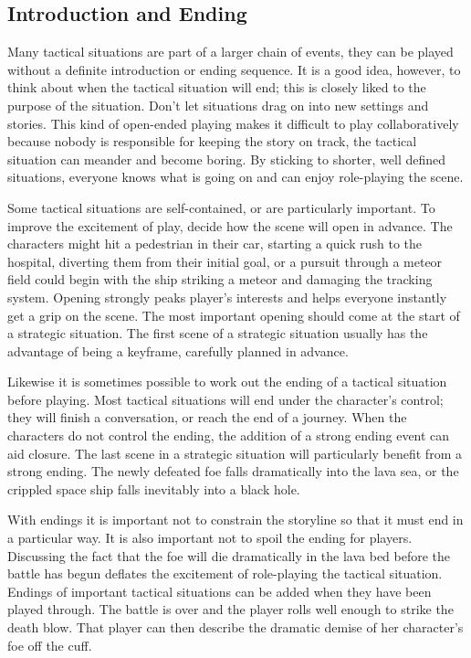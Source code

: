 \documentclass[twoside]{book}
\begin{document}
\subsection{Introduction and Ending}

Many tactical situations are part of a larger chain of events, they
can be played without a definite introduction or ending sequence. It
is a good idea, however, to think about when the tactical situation
will end; this is closely liked to the purpose of the situation. Don't
let situations drag on into new settings and stories. This kind of
open-ended playing makes it difficult to play collaboratively because
nobody is responsible for keeping the story on track, the tactical
situation can meander and become boring. By sticking to shorter, well
defined situations, everyone knows what is going on and can enjoy
role-playing the scene.

Some tactical situations are self-contained, or are particularly
important. To improve the excitement of play, decide how the scene
will open in advance. The characters might hit a pedestrian in their
car, starting a quick rush to the hospital, diverting them from their
initial goal, or a pursuit through a meteor field could begin with the
ship striking a meteor and damaging the tracking system. Opening
strongly peaks player's interests and helps everyone instantly get a
grip on the scene. The most important opening should come at the start
of a strategic situation. The first scene of a strategic situation
usually has the advantage of being a keyframe, carefully planned in
advance.

Likewise it is sometimes possible to work out the ending of a tactical
situation before playing. Most tactical situations will end under the
character's control; they will finish a conversation, or reach the end
of a journey. When the characters do not control the ending, the
addition of a strong ending event can aid closure. The last scene in a
strategic situation will particularly benefit from a strong
ending. The newly defeated foe falls dramatically into the lava sea,
or the crippled space ship falls inevitably into a black hole.

With endings it is important not to constrain the storyline so that it
must end in a particular way. It is also important not to spoil the
ending for players. Discussing the fact that the foe will die
dramatically in the lava bed before the battle has begun deflates the
excitement of role-playing the tactical situation. Endings of
important tactical situations can be added when they have been played
through. The battle is over and the player rolls well enough to strike
the death blow. That player can then describe the dramatic demise of
her character's foe off the cuff.
\end{document}

